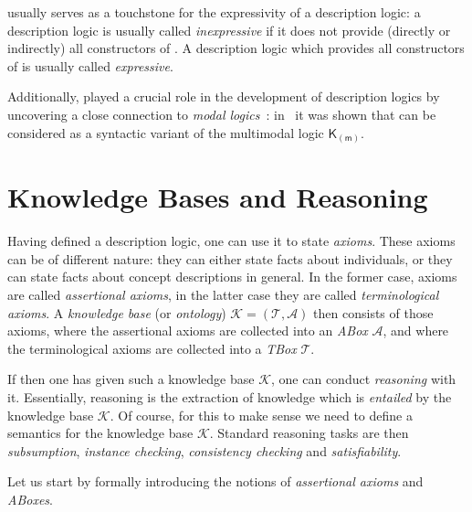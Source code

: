\ALC usually serves as a touchstone for the expressivity of a description logic: a
description logic is usually called \emph{inexpressive} if it does not provide (directly
or indirectly) all constructors of \ALC.  A description logic which provides all
constructors of \ALC is usually called \emph{expressive}.

Additionally, \ALC played a crucial role in the development of description logics by
uncovering a close connection to \emph{modal
  logics}~\cite{MLhandbook,BaaderLutz-MLhandbook-06}: in~\cite{DBLP:conf/ijcai/Schild91}
it was shown that \ALC can be considered as a syntactic variant of the multimodal logic
$\mathsf{K}_{(\mathsf{m})}$.

\section{Knowledge Bases and Reasoning}
\label{sec:knowledge-bases}

Having defined a description logic, one can use it to state \emph{axioms}.  These axioms
can be of different nature: they can either state facts about individuals, or they can
state facts about concept descriptions in general.  In the former case, axioms are called
\emph{assertional axioms}, in the latter case they are called \emph{terminological
  axioms}.  A \emph{knowledge base} (or \emph{ontology}) $\mathcal{K} = (\mathcal{T},
\mathcal{A})$ then consists of those axioms, where the assertional axioms are collected
into an \emph{ABox} $\mathcal{A}$, and where the terminological axioms are collected into
a \emph{TBox} $\mathcal{T}$.

If then one has given such a knowledge base $\mathcal{K}$, one can conduct \emph{reasoning}
with it.  Essentially, reasoning is the extraction of knowledge which is \emph{entailed}
by the knowledge base $\mathcal{K}$.  Of course, for this to make sense we need to define
a semantics for the knowledge base $\mathcal{K}$.  Standard reasoning tasks are then
\emph{subsumption}, \emph{instance checking}, \emph{consistency checking} and
\emph{satisfiability}.

Let us start by formally introducing the notions of \emph{assertional axioms} and
\emph{ABoxes}.

